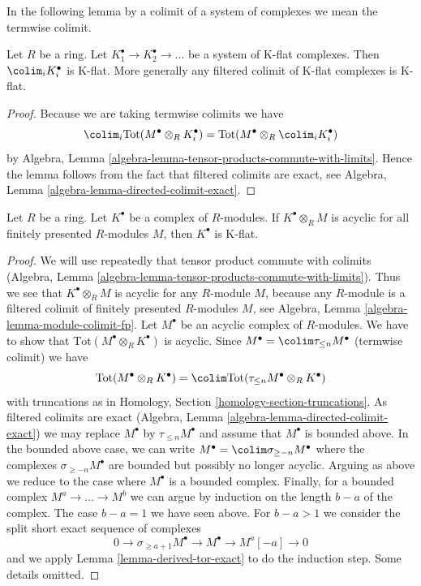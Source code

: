 \noindent
In the following lemma by a colimit of a system of complexes we mean
the termwise colimit.

\begin{lemma}
\label{lemma-colimit-K-flat}
Let $R$ be a ring.
Let $K_1^\bullet \to K_2^\bullet \to \ldots$
be a system of K-flat complexes.
Then $\colim_i K_i^\bullet$ is K-flat.
More generally any filtered colimit of K-flat complexes
is K-flat.
\end{lemma}

\begin{proof}
Because we are taking termwise colimits we have
$$
\colim_i \text{Tot}(M^\bullet \otimes_R K_i^\bullet) =
\text{Tot}(M^\bullet \otimes_R \colim_i K_i^\bullet)
$$
by Algebra, Lemma \ref{algebra-lemma-tensor-products-commute-with-limits}.
Hence the lemma follows from the fact that filtered colimits are
exact, see Algebra, Lemma \ref{algebra-lemma-directed-colimit-exact}.
\end{proof}

\begin{lemma}
\label{lemma-universally-acyclic-K-flat}
Let $R$ be a ring. Let $K^\bullet$ be a complex of $R$-modules.
If $K^\bullet \otimes_R M$ is acyclic for all finitely presented
$R$-modules $M$, then $K^\bullet$ is K-flat.
\end{lemma}

\begin{proof}
We will use repeatedly that tensor product commute with colimits
(Algebra, Lemma \ref{algebra-lemma-tensor-products-commute-with-limits}).
Thus we see that $K^\bullet \otimes_R M$ is acyclic for
any $R$-module $M$, because any $R$-module is a filtered colimit
of finitely presented $R$-modules $M$, see
Algebra, Lemma \ref{algebra-lemma-module-colimit-fp}.
Let $M^\bullet$ be an acyclic complex of $R$-modules.
We have to show that $\text{Tot}(M^\bullet \otimes_R K^\bullet)$
is acyclic. Since $M^\bullet = \colim \tau_{\leq n} M^\bullet$ (termwise
colimit) we have
$$
\text{Tot}(M^\bullet \otimes_R K^\bullet) =
\colim \text{Tot}(\tau_{\leq n} M^\bullet \otimes_R K^\bullet)
$$
with truncations as in Homology, Section \ref{homology-section-truncations}.
As filtered colimits are exact
(Algebra, Lemma \ref{algebra-lemma-directed-colimit-exact})
we may replace $M^\bullet$ by $\tau_{\leq n}M^\bullet$ and
assume that $M^\bullet$ is bounded above.
In the bounded above case, we can write
$M^\bullet = \colim \sigma_{\geq -n} M^\bullet$
where the complexes $\sigma_{\geq -n} M^\bullet$ are bounded
but possibly no longer acyclic.
Arguing as above we reduce to the case where $M^\bullet$
is a bounded complex.
Finally, for a bounded complex $M^a \to \ldots \to M^b$
we can argue by induction on the length $b - a$ of the complex.
The case $b - a = 1$ we have seen above.
For $b - a > 1$ we consider the split short exact sequence
of complexes
$$
0 \to \sigma_{\geq a + 1}M^\bullet \to M^\bullet \to M^a[-a] \to 0
$$
and we apply Lemma \ref{lemma-derived-tor-exact}
to do the induction step. Some details omitted.
\end{proof}

